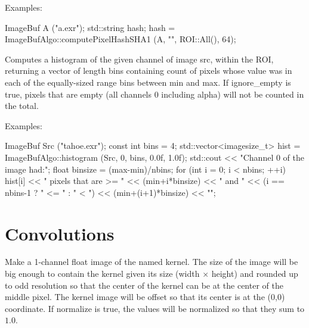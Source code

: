 \smallskip
\noindent Examples:
\begin{code}
    ImageBuf A ("a.exr");
    std::string hash;
    hash = ImageBufAlgo::computePixelHashSHA1 (A, "", ROI::All(), 64);
\end{code}
\apiend

 

Computes a histogram of the given {\cf channel} of image {\cf src}, within
the ROI, returning a vector of length {\cf bins} containing count of pixels
whose value was in each of the equally-sized range bins between {\cf min}
and {\cf max}. If {\cf ignore_empty} is {\cf true}, pixels that are empty
(all channels 0 including alpha) will not be counted in the total.

\smallskip
\noindent Examples:
\begin{code}
    ImageBuf Src ("tahoe.exr");
    const int bins = 4;
    std::vector<imagesize_t> hist =
        ImageBufAlgo::histogram (Src, 0, bins, 0.0f, 1.0f);
    std::cout << "Channel 0 of the image had:\n";
    float binsize = (max-min)/nbins;
    for (int i = 0;  i < nbins;  ++i)
        hist[i] << " pixels that are >= " << (min+i*binsize) << " and "
                << (i == nbins-1 ? " <= " : " < ")
                << (min+(i+1)*binsize) << "\n";
\end{code}
\apiend




\section{Convolutions}
\label{sec:iba:convolutions}

 
Make a 1-channel {\cf float} image of the named kernel.
The size of the image will be big enough to contain the kernel
given its size ({\cf width} $\times$ {\cf height})
and rounded up to odd resolution so
that the center of the kernel can be at the center of the middle
pixel.  The kernel image will be offset so that its center is at the
{\cf (0,0)} coordinate.  If {\cf normalize} is true, the values will be
normalized so that they sum to $1.0$.

